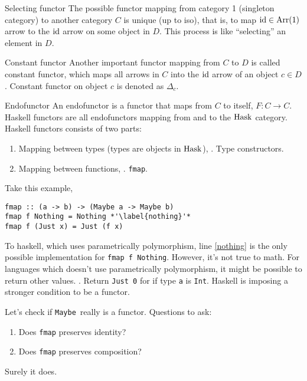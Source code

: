 \begin{definition}{Selecting functor}
The possible functor mapping from category 1 (singleton category) to
another category $C$ is unique (up to iso), that is, to map $\mathrm{id} \in \mathrm{Arr}(1)$ arrow
to the $\mathrm{id}$ arrow on some
object in $D$. This process is like ``selecting'' an element in $D$.
\end{definition}
\hfill
\begin{definition}{Constant functor}
Another important functor mapping from $C$ to $D$ is called constant functor, which maps
all arrows in $C$ into the $\mathrm{id}$ arrow of an object $c \in D$. Constant functor
on object $c$ is denoted as $\Delta_c$.
\end{definition}
\hfill
\begin{definition}{Endofunctor}
  An endofunctor is a functor that maps from $C$ to itself, $F: C \to C$. Haskell
  functors are all endofunctors mapping from and to the $\mathrm{Hask}$ category.
  Haskell functors consists of two parts:
  \begin{enumerate}
  \item Mapping between types (types are objects in $\mathrm{Hask}$), \ie. Type constructors.
  \item Mapping between functions, \ie. \verb+fmap+.
  \end{enumerate}
\end{definition}
\hfill
\begin{remark}
  Take this example,
  \begin{lstlisting}
fmap :: (a -> b) -> (Maybe a -> Maybe b)
fmap f Nothing = Nothing *'\label{nothing}'*
fmap f (Just x) = Just (f x)
  \end{lstlisting}

  To haskell, which uses parametrically polymorphism, line \ref{nothing}
  is the only possible implementation for \lstinline{fmap f Nothing}. However,
  it's not true to math. For languages which doesn't use parametrically
  polymorphism, it might be possible to return other values. \eg. Return
  \lstinline{Just 0} for if type \lstinline{a} is \lstinline{Int}. Haskell is
  imposing a stronger condition to be a functor.

  \newcommand{\Maybe}{\lstinline{Maybe}}
  Let's check if \Maybe~really is a functor. Questions to ask:
  \begin{enumerate}
  \item Does \lstinline{fmap} preserves identity?
  \item Does \lstinline{fmap} preserves composition?
  \end{enumerate}

  Surely it does.
\end{remark}
